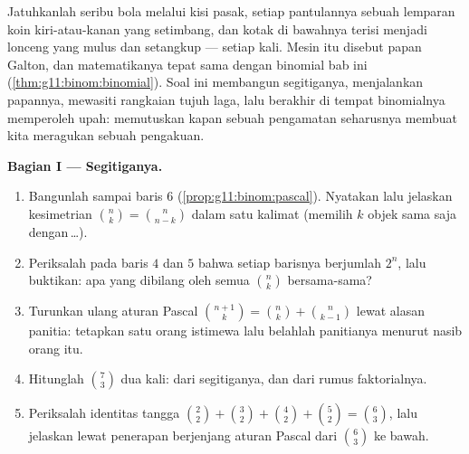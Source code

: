 \begin{problem}
\label{pb:g11:binom:1}
Jatuhkanlah seribu bola melalui kisi pasak, setiap pantulannya sebuah
lemparan koin kiri-atau-kanan yang setimbang, dan kotak di bawahnya terisi
menjadi lonceng yang mulus dan setangkup --- setiap kali. Mesin itu disebut
papan Galton, dan matematikanya tepat sama dengan  binomial bab ini
(\cref{thm:g11:binom:binomial}). Soal ini
membangun segitiganya, menjalankan papannya, mewasiti rangkaian
tujuh laga, lalu berakhir di tempat binomialnya memperoleh
upah: memutuskan kapan sebuah pengamatan seharusnya membuat kita meragukan
sebuah pengakuan.

\medskip
\noindent\textbf{Bagian I --- Segitiganya.}
\begin{enumerate}
  \item Bangunlah  sampai baris $6$
        (\cref{prop:g11:binom:pascal}). Nyatakan lalu jelaskan
        kesimetrian $\binom nk = \binom{n}{n-k}$ dalam satu kalimat
        (memilih $k$ objek sama saja dengan\,\dots).
  \item Periksalah pada baris $4$ dan $5$ bahwa setiap barisnya berjumlah
        $2^n$, lalu buktikan: apa yang dibilang oleh semua $\binom nk$
        bersama-sama?
  \item Turunkan ulang aturan Pascal
        $\binom{n+1}{k} = \binom nk + \binom{n}{k-1}$ lewat
        alasan panitia: tetapkan satu orang istimewa lalu
        belahlah panitianya menurut nasib orang itu.
  \item Hitunglah $\binom73$ dua kali: dari segitiganya, dan dari
        rumus faktorialnya.
  \item Periksalah identitas tangga
        $\binom22 + \binom32 + \binom42 + \binom52 =
        \binom63$, lalu jelaskan lewat penerapan berjenjang aturan Pascal
        dari $\binom63$ ke bawah.
\end{enumerate}


\end{problem}
